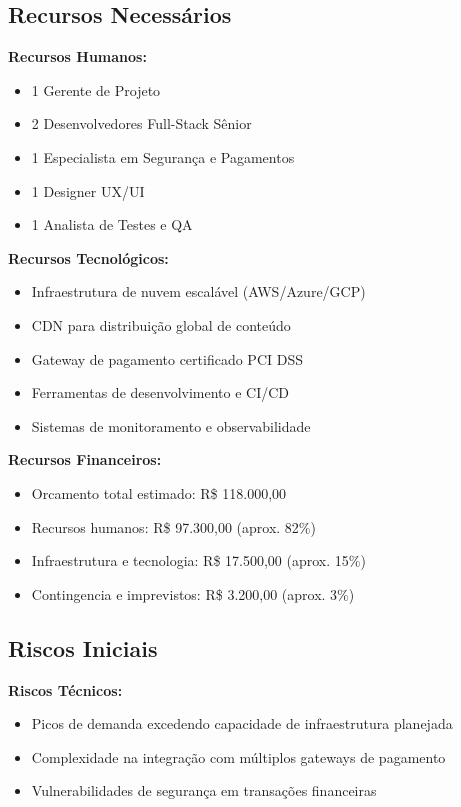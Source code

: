 \subsection{Recursos Necessários}

\textbf{Recursos Humanos:}
\begin{itemize}
    \item 1 Gerente de Projeto
    \item 2 Desenvolvedores Full-Stack Sênior
    \item 1 Especialista em Segurança e Pagamentos
    \item 1 Designer UX/UI
    \item 1 Analista de Testes e QA
\end{itemize}

\textbf{Recursos Tecnológicos:}
\begin{itemize}
    \item Infraestrutura de nuvem escalável (AWS/Azure/GCP)
    \item CDN para distribuição global de conteúdo
    \item Gateway de pagamento certificado PCI DSS
    \item Ferramentas de desenvolvimento e CI/CD
    \item Sistemas de monitoramento e observabilidade
\end{itemize}

\textbf{Recursos Financeiros:}
\begin{itemize}
    \item Orcamento total estimado: R\$ 118.000,00
    \item Recursos humanos: R\$ 97.300,00 (aprox. 82\%)
    \item Infraestrutura e tecnologia: R\$ 17.500,00 (aprox. 15\%)
    \item Contingencia e imprevistos: R\$ 3.200,00 (aprox. 3\%)
\end{itemize}

\subsection{Riscos Iniciais}

\textbf{Riscos Técnicos:}
\begin{itemize}
    \item Picos de demanda excedendo capacidade de infraestrutura planejada
    \item Complexidade na integração com múltiplos gateways de pagamento
    \item Vulnerabilidades de segurança em transações financeiras
\end{itemize}

